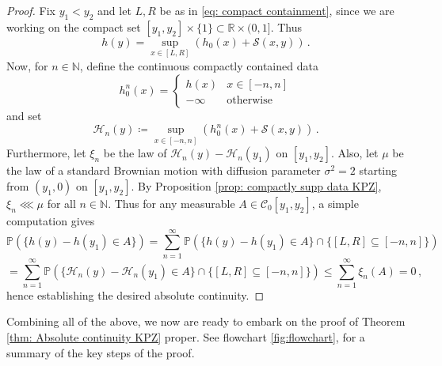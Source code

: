 \documentclass[12pt]{report}
\theoremstyle{plain}
\newcommand{\N}{\ensuremath{\mathbb{N}}}
\newcommand{\R}{\ensuremath{\mathbb{R}}}
\begin{document}
\begin{proof}
Fix $y_1<y_2$ and let $L,R$ be as in \ref{eq: compact containment}, since we are working on the compact set $[y_1, y_2]\times\{1\}\subset \R\times(0,1]$. Thus
\[
h(y) = \sup_{x\in[L,R]}(h_0(x)+\mathcal{S}(x,y))\,.
\]
Now, for $n\in \N$, define the continuous compactly contained data 
\[
h_0^n(x) = \begin{cases} h(x) & x\in [-n,n]\\
-\infty& \text{otherwise}
\end{cases}
\]
and set
\[
\mathcal{H}_n(y) \coloneqq \sup_{x\in[-n,n]}(h_0^n(x)+\mathcal{S}(x,y))\,.
\]
Furthermore, let $\xi_n$ be the law of $\mathcal{H}_n(y)- \mathcal{H}_n(y_1)$ on $[y_1, y_2]$. Also, let $\mu$ be the law of a standard Brownian motion with diffusion parameter $\sigma^2 = 2$ starting from $(y_1, 0)$ on $[y_1,y_2]$. By Proposition \ref{prop: compactly supp data KPZ}, $\xi_n\lll\mu$ for all $n\in\N$. Thus for any measurable $A\in \mathcal{C}_0[y_1,y_2]$, a simple computation gives
\[
\mathbb{P}(\{h(y)-h(y_1)\in A\}) = \displaystyle \sum_{n=1}^\infty \mathbb{P}(\{h(y)-h(y_1)\in A\}\cap\{[L,R]\subseteq[-n,n]\})\]
\[
= \displaystyle \sum_{n=1}^\infty \mathbb{P}(\{\mathcal{H}_n(y)-\mathcal{H}_n(y_1)\in A\}\cap\{[L,R]\subseteq[-n,n]\}) \leq \displaystyle \sum_{n=1}^\infty \xi_n(A)  =  0\,,
\]
hence establishing the desired absolute continuity.
\end{proof}

Combining all of the above, we now are ready to embark on the proof of Theorem \ref{thm: Absolute continuity KPZ} proper. See flowchart \ref{fig:flowchart}, for a summary of the key steps of the proof.
\end{document}
